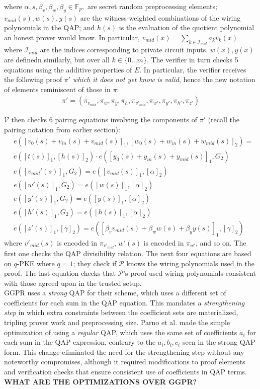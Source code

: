 where $\alpha, s, \beta_v, \beta_w, \beta_y \in \mathbb{F}_p, $ are secret random preprocessing elements; $v_{mid}(s), w(s), y(s)$ are the witness-weighted combinations of the wiring polynomials in the QAP; and $h(s)$ is the evaluation of the quotient polynomial an honest prover would know. In particular, $v_{mid}(x) = \sum_{k \in \mathcal{I}_{mid}} a_k v_k(x)$ where $\mathcal{I}_{mid}$ are the indices corresponding to private circuit inputs. $w(x), y(x)$ are definedn similarly, but over all $k \in \{0 \dots m\}$. The verifier in turn checks 5 equations using the additive properties of $E$. In particular, the verifier receives the following proof $\pi'$ \textit{which it does not yet know is valid}, hence the new notation of elements reminiscent of those in $\pi$:
\begin{align}
\pi' = (\pi_{v_{mid}}, \pi_{w}, \pi_{y}, \pi_{h}, \pi_{v'_{mid}}, \pi_{w'}, \pi_{y'}, \pi_{h'}, \pi_{z'})
\end{align}

\noindent $\mathcal{V}$ then checks 6 pairing equations involving the components of $\pi'$ (recall the pairing notation from earlier section):  
\begin{align}
&e([v_0(s) + v_{in}(s) + v_{mid}(s)]_1, [w_0(s) + w_{in}(s) + w_{mid}(s)]_2) = \\ 
&e([t(s)]_1, [h(s)]_2) \cdot e([y_0(s) + y_{in}(s) + y_{mid}(s)]_1, G_2) \\
&e([v_{mid}'(s)]_1, G_2) = e([v_{mid}(s)]_1, [\alpha]_2) \\
&e([w'(s)]_1, G_2) = e([w(s)]_1, [\alpha]_2) \\
&e([y'(s)]_1, G_2) = e([y(s)]_1, [\alpha]_2) \\
&e([h'(s)]_1, G_2) = e([h(s)]_1, [\alpha]_2) \\
&e([z'(s)]_1, [\gamma]_2) = e([\beta_v v_{mid}(s) + \beta_w w(s) + \beta_y y(s)]_1, [\gamma]_2)
\end{align}
\noindent where $v'_{mid}(s)$ is encoded in $\pi_{v'_{mid}}$, $w'(s)$ is encoded in $\pi_{w'}$, and so on. The first one checks the QAP divisibility relation. The next four equations are based on $q$-PKE where $q = 1$; they check if $\mathcal{P}$ knows the wiring polynomials used in the proof. The last equation checks that $\mathcal{P}$'s proof used wiring polynomials consistent with those agreed upon in the trusted setup. \\

\noindent GGPR uses a \textit{strong} QAP for their scheme, which uses a different set of coefficients for each sum in the QAP equation. This mandates a \textit{strengthening step} in which extra constraints between the coefficient sets are materialized, tripling prover work and preprocessing size. Parno et al. \cite{pinocchio} made the simple optimization of using a \textit{regular} QAP, which uses the same set of coefficients $a_i$ for each sum in the QAP expression, contrary to the $a_i, b_i, c_i$ seen in the strong QAP form. This change eliminated the need for the strengthening step without any noteworthy compromises, although it required modifications to proof elements and verification checks that ensure consistent use of coefficients in QAP terms. \textbf{WHAT ARE THE OPTIMIZATIONS OVER GGPR?}\\

